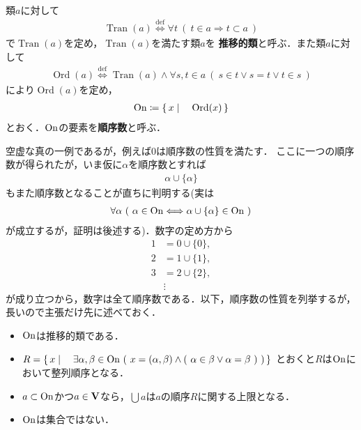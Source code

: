 	\begin{screen}
		\begin{dfn}[順序数]
			類$a$に対して
			\begin{align}
				\operatorname{Tran}(a) \overset{\mathrm{def}}{\Longleftrightarrow}
				\forall t\ (\ t \in a \Longrightarrow t \subset a\ )
			\end{align}
			で$\operatorname{Tran}(a)$を定め，$\operatorname{Tran}(a)$を満たす類$a$を
			{\bf 推移的類}と呼ぶ．また類$a$に対して
			\begin{align}
				\operatorname{Ord}(a) \overset{\mathrm{def}}{\Longleftrightarrow}
				\operatorname{Tran}(a)
				\wedge \forall s,t \in a\ (\ s \in t \vee s = t \vee t \in s\ )
			\end{align}
			により$\operatorname{Ord}(a)$を定め，
			\begin{align}
				\mathrm{On} \coloneqq \left\{\, x \mid \quad \operatorname{Ord}(x)\, \right\}
			\end{align}
			とおく．$\mathrm{On}$の要素を{\bf 順序数}と呼ぶ．
		\end{dfn}
	\end{screen}
	
	空虚な真の一例であるが，例えば$0$は順序数の性質を満たす．
	ここに一つの順序数が得られたが，いま仮に$\alpha$を順序数とすれば
	\begin{align}
		\alpha \cup \{\alpha\}
	\end{align}
	もまた順序数となることが直ちに判明する(実は
	\begin{align}
		\forall \alpha\ (\ \alpha \in \mathrm{On} \Longleftrightarrow \alpha \cup \{\alpha\} \in \mathrm{On}\ )
	\end{align}
	が成立するが，証明は後述する)．数字の定め方から
	\begin{align}
		1 &= 0 \cup \{0\}, \\
		2 &= 1 \cup \{1\}, \\
		3 &= 2 \cup \{2\}, \\
		&\vdots
	\end{align}
	が成り立つから，数字は全て順序数である．以下，順序数の性質を列挙するが，長いので主張だけ先に述べておく．
	\begin{itemize}
		\item $\mathrm{On}$は推移的類である．
		\item $R = \Set{x}{\exists \alpha,\beta \in \ON\ 
			(\ x=(\alpha,\beta) \wedge (\ \alpha \in \beta \vee \alpha = \beta\ )\ )}$
			とおくと$R$は$\mathrm{On}$において整列順序となる．
		\item $a \subset \mathrm{On}$かつ$a \in \mathbf{V}$なら，$\bigcup a$は$a$の順序$R$に関する上限となる．
		\item $\mathrm{On}$は集合ではない．
	\end{itemize}
	

